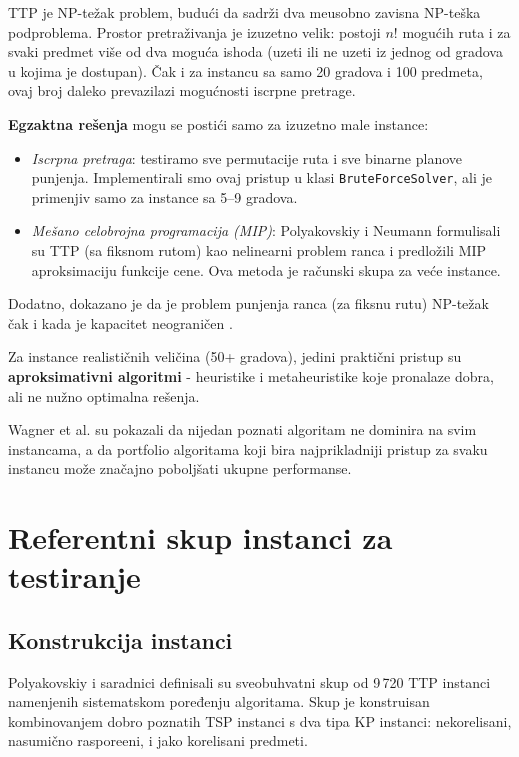 \documentclass[12pt,a4paper]{article}
\begin{document}
TTP je NP-te\v{z}ak problem, budu\'{c}i da sadr\v{z}i dva me\dj{}usobno zavisna NP-te\v{s}ka podproblema. Prostor pretra\v{z}ivanja je izuzetno velik: postoji $n!$ mogu\'{c}ih ruta i za svaki predmet vi\v{s}e od dva mogu\'{c}a ishoda (uzeti ili ne uzeti iz jednog od gradova u kojima je dostupan). Čak i za instancu sa samo 20 gradova i 100 predmeta, ovaj broj daleko prevazilazi mogu\'{c}nosti iscrpne pretrage.

\textbf{Egzaktna re\v{s}enja} mogu se posti\'{c}i samo za izuzetno male instance:
\begin{itemize}
    \item \textit{Iscrpna pretraga}: testiramo sve permutacije ruta i sve binarne planove punjenja. Implementirali smo ovaj pristup u klasi \texttt{BruteForceSolver}, ali je primenjiv samo za instance sa 5--9 gradova.
    \item \textit{Me\v{s}ano celobrojna programacija (MIP)}: Polyakovskiy i Neumann \cite{polyakovskiy2015} formulisali su TTP (sa fiksnom rutom) kao nelinearni problem ranca i predlo\v{z}ili MIP aproksimaciju funkcije cene. Ova metoda je ra\v{c}unski skupa za ve\'{c}e instance. 
   \end{itemize}
 
Dodatno, dokazano je da je problem punjenja ranca (za fiksnu rutu) NP-te\v{z}ak \v{c}ak i kada je kapacitet neograni\v{c}en \cite{polyakovskiy2015}.

Za instance realisti\v{c}nih veli\v{c}ina (50+ gradova), jedini prakti\v{c}ni pristup su \textbf{aproksimativni algoritmi} - heuristike i metaheuristike koje pronalaze dobra, ali ne nu\v{z}no optimalna re\v{s}enja.

Wagner et al. \cite{wagner_selection} su pokazali da nijedan poznati algoritam ne dominira na svim instancama, a da portfolio algoritama koji bira najprikladniji pristup za svaku instancu mo\v{z}e zna\v{c}ajno pobolj\v{s}ati ukupne performanse.

\section{Referentni skup instanci za testiranje}

\subsection{Konstrukcija instanci}

Polyakovskiy i saradnici \cite{polyakovskiy2014} definisali su sveobuhvatni skup od 9\,720 TTP instanci namenjenih sistematskom poređenju algoritama. Skup je konstruisan kombinovanjem dobro poznatih TSP instanci s dva tipa KP instanci: nekorelisani, nasumi\v{c}no raspore\dj{}eni, i jako korelisani predmeti.
\end{document}

